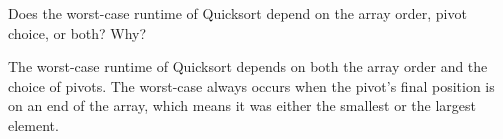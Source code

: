 \begin{blocksection}
\question Does the worst-case runtime of Quicksort depend on the array order,
pivot choice, or both? Why?

\begin{solution}[1in]
The worst-case runtime of Quicksort depends on both the array order and the
choice of pivots. The worst-case always occurs when the pivot's final position
is on an end of the array, which means it was either the smallest or the
largest element.
\end{solution}
\end{blocksection}
